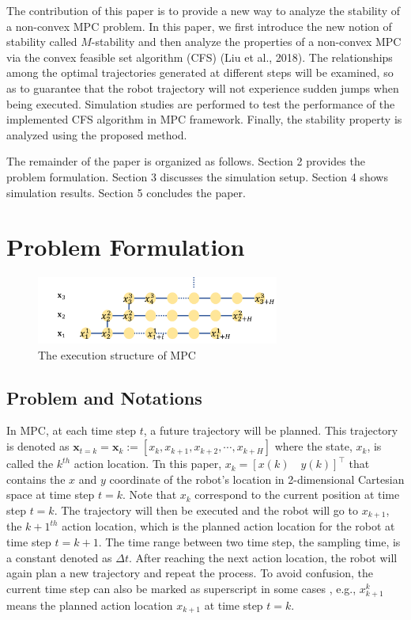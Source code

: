 The contribution of this paper is to provide a new way to analyze the stability of a non-convex MPC problem. In this paper, we first introduce the new notion of stability called $M$-stability and then analyze the properties of a non-convex MPC via the convex feasible set algorithm (CFS) (Liu et al., 2018).  The relationships among the optimal trajectories generated at different steps will be examined, so as to  guarantee that the robot trajectory will not experience sudden jumps when being executed. Simulation studies are performed to test the performance of the implemented CFS  algorithm in MPC framework. Finally, the stability property is analyzed using the proposed method.

The remainder of the paper is organized as follows. Section 2 provides the problem formulation. Section 3 discusses the simulation setup. Section 4 shows simulation results. Section 5 concludes the paper.

\section{Problem Formulation}

\begin{figure}[t]
\begin{center}
\includegraphics[width=8cm]{src/MPCstruc.png}
\caption{The execution structure of MPC}
\label{fig: mpc}
\end{center}
\end{figure}

\subsection{Problem and Notations}
In MPC, at each time step $t$, a future trajectory will be planned. This trajectory is denoted as $\mathbf{x}_{t=k}=\mathbf{x}_{k} := [x_k, x_{k+1},x_{k+2},\cdots,x_{k+H}]$ where the state, $x_k$, is called the $k^{th}$ action location. Tn this paper, $x_k= [x(k)\quad y(k)]^{\intercal}$ that contains the $x$ and $y$ coordinate of the robot's location in 2-dimensional Cartesian space at time step $t=k$. Note that $x_k$ correspond to the current position at time step $t=k$. The trajectory will then be executed and the robot will go to $x_{k+1}$, the $k+1^{th}$ action location, which is the planned action location for the robot at time step $t=k+1$. The time range between two time step, the sampling time, is a constant denoted as $\Delta t$. After reaching the next action location, the robot will again plan a new trajectory and repeat the process. To avoid confusion, the current time step can also be marked as superscript in some cases , e.g., $x_{k+1}^k$ means the planned action location $x_{k+1}$ at time step $t=k$.

